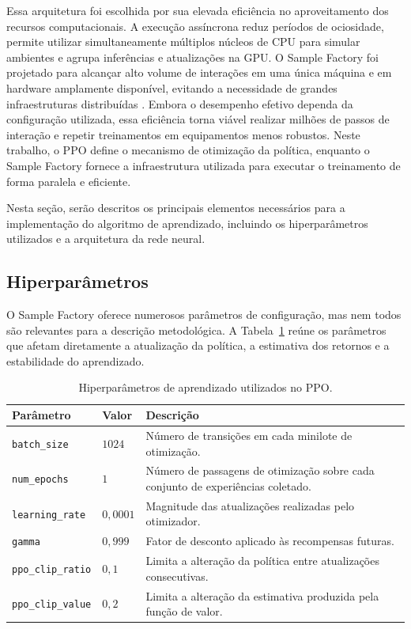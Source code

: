Essa arquitetura foi escolhida por sua elevada eficiência no aproveitamento dos recursos computacionais. A execução assíncrona reduz períodos de ociosidade, permite utilizar simultaneamente múltiplos núcleos de CPU para simular ambientes e agrupa inferências e atualizações na GPU. O Sample Factory foi projetado para alcançar alto volume de interações em uma única máquina e em hardware amplamente disponível, evitando a necessidade de grandes infraestruturas distribuídas \cite{sample_factory}. Embora o desempenho efetivo dependa da configuração utilizada, essa eficiência torna viável realizar milhões de passos de interação e repetir treinamentos em equipamentos menos robustos. Neste trabalho, o PPO define o mecanismo de otimização da política, enquanto o Sample Factory fornece a infraestrutura utilizada para executar o treinamento de forma paralela e eficiente.

Nesta seção, serão descritos os principais elementos necessários para a implementação do algoritmo de aprendizado, incluindo os hiperparâmetros utilizados e a arquitetura da rede neural.

\subsection{Hiperparâmetros}

O Sample Factory oferece numerosos parâmetros de configuração, mas nem todos são relevantes para a descrição metodológica. A Tabela~\ref{tab:hiperparametros-ppo} reúne os parâmetros que afetam diretamente a atualização da política, a estimativa dos retornos e a estabilidade do aprendizado.

\begin{table}[h!]
\centering
\small
\caption{Hiperparâmetros de aprendizado utilizados no PPO.}
\label{tab:hiperparametros-ppo}
\begin{tabular}{l|l|p{7cm}}
\hline
\textbf{Parâmetro} & \textbf{Valor} & \textbf{Descrição} \\
\hline
\texttt{batch\_size} & $1024$ & Número de transições em cada minilote de otimização. \\
\texttt{num\_epochs} & $1$ & Número de passagens de otimização sobre cada conjunto de experiências coletado. \\
\texttt{learning\_rate} & $0{,}0001$ & Magnitude das atualizações realizadas pelo otimizador. \\
\texttt{gamma} & $0{,}999$ & Fator de desconto aplicado às recompensas futuras. \\
\texttt{ppo\_clip\_ratio} & $0{,}1$ & Limita a alteração da política entre atualizações consecutivas. \\
\texttt{ppo\_clip\_value} & $0{,}2$ & Limita a alteração da estimativa produzida pela função de valor. \\
\hline
\end{tabular}
\end{table}

